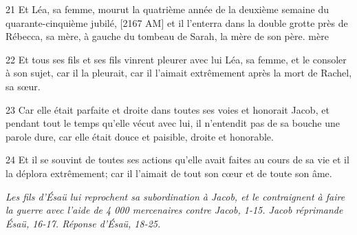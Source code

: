 \par 21 Et Léa, sa femme, mourut la quatrième année de la deuxième semaine du quarante-cinquième jubilé, [2167 AM] et il l'enterra dans la double grotte près de Rébecca, sa mère, à gauche du tombeau de Sarah, la mère de son père. mère
\par 22 Et tous ses fils et ses fils vinrent pleurer avec lui Léa, sa femme, et le consoler à son sujet, car il la pleurait, car il l'aimait extrêmement après la mort de Rachel, sa sœur.
\par 23 Car elle était parfaite et droite dans toutes ses voies et honorait Jacob, et pendant tout le temps qu'elle vécut avec lui, il n'entendit pas de sa bouche une parole dure, car elle était douce et paisible, droite et honorable.
\par 24 Et il se souvint de toutes ses actions qu'elle avait faites au cours de sa vie et il la déplora extrêmement; car il l'aimait de tout son cœur et de toute son âme.


\par \textit{Les fils d'Ésaü lui reprochent sa subordination à Jacob, et le contraignent à faire la guerre avec l'aide de 4 000 mercenaires contre Jacob, 1-15. Jacob réprimande Ésaü, 16-17. Réponse d'Ésaü, 18-25.}

